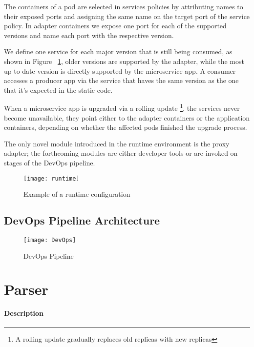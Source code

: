 The containers of a pod are selected in services policies by attributing names to their exposed ports and assigning the same name on the target port of the service policy.
In adapter containers we expose one port for each of the supported versions and name each port with the respective version.

We define one service for each major version that is still being consumed, as shown in Figure ~\ref{fig:runtime},
older versions are supported by the adapter, while the most up to date version is directly supported by the microservice app.
A consumer accesses a producer app via the service that haves the same version as the one that it's expected in the static code.

When a microservice app is upgraded via a rolling update \footnote{A rolling update gradually replaces old replicas with new replicas},
the services never become unavailable, they point either to the adapter containers or the application containers, depending on whether the affected pods finished the upgrade process.

The only novel module introduced in the runtime environment is the proxy adapter;
the forthcoming modules are either developer tools or are invoked on stages of the DevOps pipeline.

\begin{figure}[htbp]
    \centering
    \texttt{[image: runtime]}
    \caption{Example of a runtime configuration}
    \label{fig:runtime}
\end{figure}

\subsection{DevOps Pipeline Architecture} %
\label{sec:devops_pipeline_architecture}

\begin{figure}[htbp]
    \centering
    \texttt{[image: DevOps]}
    \caption{DevOps Pipeline}
    \label{fig:pipeline}
\end{figure}

\newpage

\section{Parser} %
\label{sec:parser}

\paragraph{Description}
